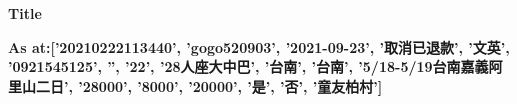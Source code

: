 \documentclass{article}%
\begin{document}
%
\normalsize%
\pagestyle{header}%
\begin{minipage}{\textwidth}%
\centering%
\begin{Large}%
\textbf{Title}%
\end{Large}%
\linebreak%
\begin{large}%
\textbf{As at:{[}'20210222113440', 'gogo520903', '2021{-}09{-}23', '取消已退款', '文英', '0921545125', '', '22', '28人座大中巴', '台南', '台南', '5/18{-}5/19台南嘉義阿里山二日', '28000', '8000', '20000', '是', '否', '童友柏村'{]}}%
\end{large}%
\end{minipage}%
\end{document}
